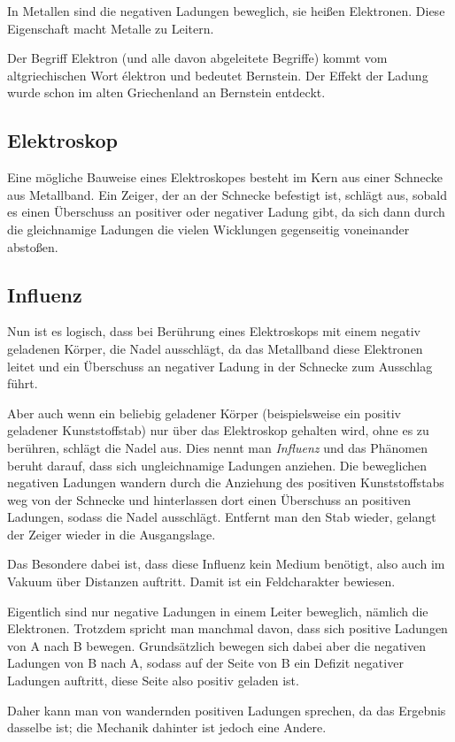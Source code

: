 In Metallen sind die negativen Ladungen beweglich, sie heißen Elektronen. Diese Eigenschaft macht Metalle zu \glqq Leitern\grqq .

\begin{NiceToKnow}
Der Begriff Elektron (und alle davon abgeleitete Begriffe) kommt vom altgriechischen Wort \glqq élektron\grqq{} und bedeutet \glqq Bernstein\grqq . Der Effekt der Ladung wurde schon im alten Griechenland an Bernstein entdeckt.
\end{NiceToKnow}


\subsection{Elektroskop}	\label{subsec:Elektroskop}

Eine mögliche Bauweise eines Elektroskopes besteht im Kern aus einer Schnecke aus Metallband. Ein Zeiger, der an der Schnecke befestigt ist, schlägt aus, sobald es einen Überschuss an positiver oder negativer Ladung gibt, da sich dann durch die gleichnamige Ladungen die vielen Wicklungen gegenseitig voneinander abstoßen.


\subsection{Influenz} \label{subsec:Influenz}

Nun ist es logisch, dass bei Berührung eines Elektroskops mit einem negativ geladenen Körper, die Nadel ausschlägt, da das Metallband diese Elektronen leitet und ein Überschuss an negativer Ladung in der Schnecke zum Ausschlag führt.

Aber auch wenn ein beliebig geladener Körper (beispielsweise ein positiv geladener Kunststoffstab) nur über das Elektroskop gehalten wird, ohne es zu berühren, schlägt die Nadel aus. Dies nennt man \emph{Influenz} und das Phänomen beruht darauf, dass sich ungleichnamige Ladungen anziehen. Die beweglichen negativen Ladungen wandern durch die Anziehung des positiven Kunststoffstabs weg von der Schnecke und hinterlassen dort einen Überschuss an positiven Ladungen, sodass die Nadel ausschlägt. Entfernt man den Stab wieder, gelangt der Zeiger wieder in die Ausgangslage.

Das Besondere dabei ist, dass diese Influenz kein Medium benötigt, also auch im Vakuum über Distanzen auftritt. Damit ist ein Feldcharakter bewiesen.

\begin{Anmerkung}
Eigentlich sind nur negative Ladungen in einem Leiter beweglich, nämlich die Elektronen. Trotzdem spricht man manchmal davon, dass sich positive Ladungen von A nach B bewegen. Grundsätzlich bewegen sich dabei aber die negativen Ladungen von B nach A, sodass auf der Seite von B ein Defizit negativer Ladungen auftritt, diese Seite also positiv geladen ist.

Daher kann man von wandernden positiven Ladungen sprechen, da das Ergebnis dasselbe ist; die Mechanik dahinter ist jedoch eine Andere.
\end{Anmerkung}